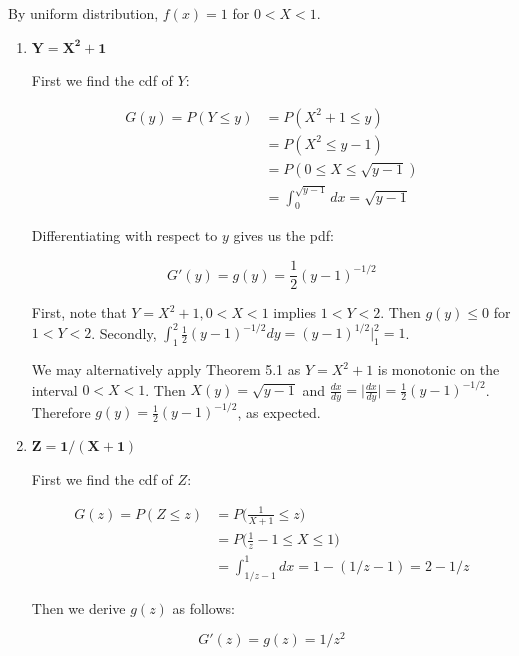 \documentclass[10pt, oneside]{article}
\begin{document}
\begin{enumerate}[label=5.\arabic*]
By uniform distribution, $f(x) = 1$ for $0 < X < 1$.

	\begin{enumerate}
	\item  \begin{tcolorbox}[
	  colback=Cerulean!5!white,
	  colframe=Cerulean!75!black]
	\textbf{$\bm{Y = X^2 + 1}$}
	\end{tcolorbox}
	
	First we find the cdf of $Y$:
	
	\begin{align*}
	G(y) = P(Y \leq y) &= P(X^2 + 1 \leq y) \\
	&= P(X^2 \leq y - 1) \\
	&= P(0 \leq X \leq \sqrt{y-1}) \\
	&= \int^{\sqrt{y-1}}_0 dx = \sqrt{y-1}
	\end{align*}
	
	Differentiating with respect to $y$ gives us the pdf:
	
	\[ G'(y) = g(y) = \boxed{ \frac{1}{2} (y - 1)^{-1/2} } \]
	
	First, note that $Y = X^2 + 1, 0 < X < 1$ implies $1 < Y < 2$. Then $g(y) \leq 0$ for $1 < Y < 2$. Secondly, $\int^2_1 \frac{1}{2} (y-1)^{-1/2} dy = (y-1)^{1/2} \big|^2_1 = \boxed{1}$.
	
	We may alternatively apply Theorem 5.1 as $Y = X^2 + 1$ is monotonic on the interval $0 < X < 1$. Then $X(y) = \sqrt{y - 1}$ and $\frac{dx}{dy} = \big| \frac{dx}{dy} \big| = \frac{1}{2} (y-1)^{-1/2}$. Therefore $g(y) = \frac{1}{2} (y-1)^{-1/2}$, as expected.
	
	\item  \begin{tcolorbox}[
	  colback=Cerulean!5!white,
	  colframe=Cerulean!75!black]
	\textbf{$\bm{Z = 1 / (X + 1)}$}
	\end{tcolorbox}
	
	First we find the cdf of $Z$:
	
	\begin{align*}
	G(z) = P(Z \leq z) &= P \Big( \frac{1}{X + 1} \leq z \Big) \\
	&= P \Big( \frac{1}{z} - 1 \leq X \leq 1 \Big) \\
	&= \int^1_{1/z - 1} dx = 1 - (1/z - 1) = 2 - 1/z
	\end{align*}
	
	Then we derive $g(z)$ as follows:
	
	\[ G'(z) = g(z) = \boxed{1 / z^2} \]
	

\end{enumerate}
\end{enumerate}
\end{document}
